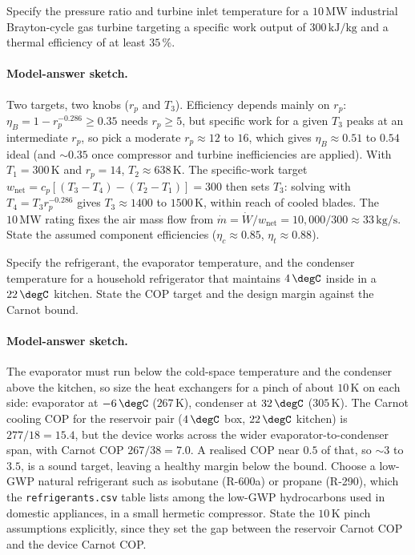 \begin{exercise}
Specify the pressure ratio and turbine inlet temperature for a
$10\,\text{MW}$ industrial Brayton-cycle gas turbine targeting a
specific work output of $300\,\text{kJ}/\text{kg}$ and a thermal
efficiency of at least $35\,\%$.

\paragraph{Model-answer sketch.} Two targets, two knobs ($r_p$ and
$T_3$). Efficiency depends mainly on $r_p$: $\eta_B = 1 -
r_p^{-0.286} \ge 0.35$ needs $r_p \ge 5$, but specific work for a given
$T_3$ peaks at an intermediate $r_p$, so pick a moderate $r_p \approx
12$ to $16$, which gives $\eta_B \approx 0.51$ to $0.54$ ideal (and
$\sim 0.35$ once compressor and turbine inefficiencies are applied).
With $T_1 = 300\,\si{\kelvin}$ and $r_p = 14$, $T_2 \approx 638\,\si{
\kelvin}$. The specific-work target $w_{\text{net}} = c_p[(T_3 - T_4) -
(T_2 - T_1)] = 300$ then sets $T_3$: solving with $T_4 = T_3
r_p^{-0.286}$ gives $T_3 \approx 1400$ to $1500\,\si{\kelvin}$, within
reach of cooled blades. The $10\,\text{MW}$ rating fixes the air mass
flow from $\dot m = \dot W/w_{\text{net}} = 10{,}000/300 \approx
33\,\text{kg}/\text{s}$. State the assumed component efficiencies
($\eta_c \approx 0.85$, $\eta_t \approx 0.88$).
\end{exercise}

\begin{exercise}
Specify the refrigerant, the evaporator temperature, and the condenser
temperature for a household refrigerator that maintains $4\,\degC$
inside in a $22\,\degC$ kitchen. State the COP target and the design
margin against the Carnot bound.

\paragraph{Model-answer sketch.} The evaporator must run below the
cold-space temperature and the condenser above the kitchen, so size the
heat exchangers for a pinch of about $10\,\si{\kelvin}$ on each side:
evaporator at $-6\,\degC$ ($267\,\si{\kelvin}$), condenser at
$32\,\degC$ ($305\,\si{\kelvin}$). The Carnot cooling COP for the
reservoir pair ($4\,\degC$ box, $22\,\degC$ kitchen) is $277/18 = 15.4$,
but the device works across the wider evaporator-to-condenser span, with
Carnot COP $267/38 = 7.0$. A realised COP near $0.5$ of that, so $\sim
3$ to $3.5$, is a sound target, leaving a healthy margin below the
bound. Choose a low-GWP natural refrigerant such as isobutane (R-600a)
or propane (R-290), which the \texttt{refrigerants.csv} table lists
among the low-GWP hydrocarbons used in domestic appliances, in a small
hermetic compressor. State the
$10\,\si{\kelvin}$ pinch assumptions explicitly, since they set the gap
between the reservoir Carnot COP and the device Carnot COP.
\end{exercise}

